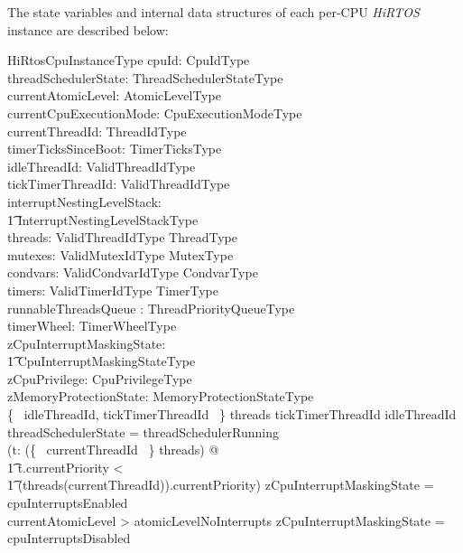 \documentclass{AUJarticle}
\begin{document}
The state variables and internal data structures of each per-CPU \emph{HiRTOS} instance
are described below:

\begin{schema}{HiRtosCpuInstanceType}
    cpuId: CpuIdType \\
    threadSchedulerState: ThreadSchedulerStateType \\
    currentAtomicLevel: AtomicLevelType \\
    currentCpuExecutionMode: CpuExecutionModeType \\
    currentThreadId: ThreadIdType \\
    timerTicksSinceBoot: TimerTicksType \\
    idleThreadId: ValidThreadIdType \\
    tickTimerThreadId: ValidThreadIdType \\
    interruptNestingLevelStack: \\
    \t1 InterruptNestingLevelStackType \\
    threads: ValidThreadIdType \finj ThreadType \\
    mutexes: ValidMutexIdType \finj MutexType \\
    condvars: ValidCondvarIdType \finj CondvarType \\
    timers: ValidTimerIdType \finj TimerType \\
    runnableThreadsQueue : ThreadPriorityQueueType \\
    timerWheel: TimerWheelType \\
    zCpuInterruptMaskingState: \\
    \t1 CpuInterruptMaskingStateType \\
    zCpuPrivilege: CpuPrivilegeType \\
    zMemoryProtectionState: MemoryProtectionStateType \\
\where
    \{~ idleThreadId, tickTimerThreadId ~\} \subseteq \dom threads
\also
    tickTimerThreadId \neq idleThreadId
\also
    threadSchedulerState = threadSchedulerRunning \implies \\
    (\forall t: \ran (\{~ currentThreadId ~\} \ndres threads) @ \\
\t1             t.currentPriority < \\
\t1               (threads(currentThreadId)).currentPriority)
\also
    zCpuInterruptMaskingState = cpuInterruptsEnabled \iff \\
    currentAtomicLevel > atomicLevelNoInterrupts
\also
    zCpuInterruptMaskingState = cpuInterruptsDisabled \implies \\

\end{schema}
\end{document}
